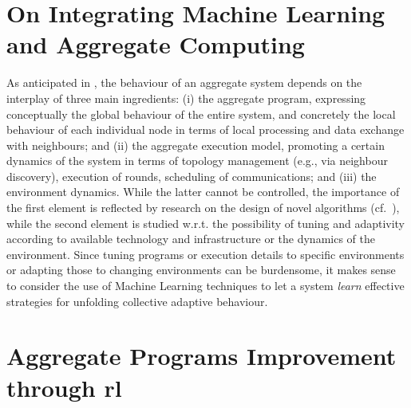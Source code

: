 \begin{comment}
\section{Reinforcement Learning-based Aggregate Computing}\label{coordination2022:s:contrib}
\end{comment}
\section{On Integrating Machine Learning and Aggregate Computing}

As anticipated in , the behaviour of an aggregate system depends on the interplay of three main ingredients:
 (i) the aggregate program, expressing conceptually the global behaviour of the entire system, and concretely the local behaviour of each individual node in terms of local processing and data exchange with neighbours; and 
 (ii) the aggregate execution model, promoting a certain dynamics of the system in terms of topology management (e.g., via neighbour discovery), execution of rounds, scheduling of communications; and
 (iii) the environment dynamics.
%
While the latter cannot be controlled, 
 the importance of the first element is reflected by research
 on the design of novel algorithms (cf.~\cite{DBLP:journals/jlap/ViroliBDACP19,DBLP:conf/saso/AudritoCDV17}),
 while the second element is studied 
 w.r.t. the possibility of tuning and adaptivity 
 according to 
 available technology and infrastructure 
 or the dynamics of the environment. %
%
Since tuning programs or execution details to specific environments
 or adapting those to changing environments
 can be burdensome,
 it makes sense to consider the use of Machine Learning techniques
 to let a system \emph{learn} effective strategies for unfolding collective adaptive behaviour.
%

\section{Aggregate Programs Improvement through \ac{rl}}


